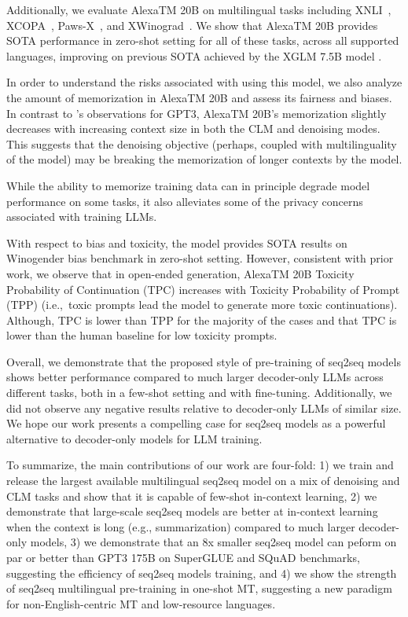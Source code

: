 Additionally, we evaluate {AlexaTM 20B} on multilingual tasks including XNLI~\citep{Conneau2018XNLIEC}, XCOPA~\citep{Ponti2020XCOPAAM}, Paws-X~\citep{Yang2019PAWSXAC}, and XWinograd~\citep{Tikhonov2021ItsAI}. We show that {AlexaTM 20B} provides SOTA performance in zero-shot setting for all of these tasks, across all supported languages, improving on previous SOTA achieved by the XGLM 7.5B model \citep{Lin2021FewshotLW}.

In order to understand the risks associated with using this model, we also analyze the amount of memorization in {AlexaTM 20B} and assess its fairness and biases. In contrast to \citet{Carlini2022QuantifyingMA}’s observations for GPT3, {AlexaTM 20B}'s memorization slightly decreases with increasing context size in both the CLM and denoising modes. This suggests that the denoising objective (perhaps, coupled with multilinguality of the model) may be breaking the memorization of longer contexts by the model.   

While the ability to memorize training data can in principle degrade model performance on some tasks, it also alleviates some of the privacy concerns associated with training LLMs. 

With respect to bias and toxicity, the model provides SOTA results on Winogender bias benchmark in zero-shot setting. However, consistent with prior work, we observe that in open-ended generation, {AlexaTM 20B} Toxicity Probability of Continuation (TPC) increases with Toxicity Probability of Prompt (TPP) (i.e.,\ toxic prompts lead the model to generate more toxic continuations). Although, TPC is lower than TPP for the majority of the cases and that TPC is lower than the human baseline for low toxicity prompts. 

Overall, we demonstrate that the proposed style of pre-training of seq2seq models shows better performance compared to much larger decoder-only LLMs across different tasks, both in a few-shot setting and with fine-tuning. Additionally, we did not observe any negative results relative to decoder-only LLMs of similar size. We hope our work presents a compelling case for seq2seq models as a powerful alternative to decoder-only models for LLM training.

To summarize, the main contributions of our work are four-fold: 1) we train and release the largest available multilingual seq2seq model on a mix of denoising and CLM tasks and show that it is capable of few-shot in-context learning, 2) we demonstrate that large-scale seq2seq models are better at in-context learning when the context is long (e.g., summarization) compared to much larger decoder-only models, 3) we demonstrate that an 8x smaller seq2seq model can peform on par or better than GPT3 175B on SuperGLUE and SQuAD benchmarks, suggesting the efficiency of seq2seq models training, and 4) we show the strength of seq2seq multilingual pre-training in one-shot MT, suggesting a new paradigm for  non-English-centric MT and low-resource languages.

